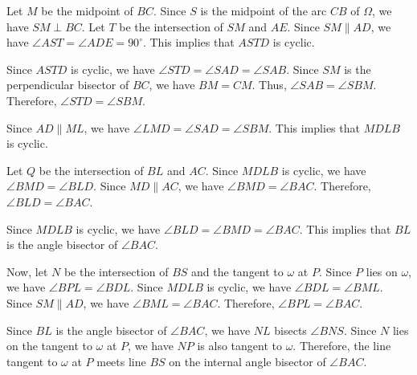 Let $M$ be the midpoint of $BC$. Since $S$ is the midpoint of the arc $CB$ of $\Omega$, we have $SM \perp BC$. Let $T$ be the intersection of $SM$ and $AE$. Since $SM \parallel AD$, we have $\angle AST = \angle ADE = 90^\circ$. This implies that $ASTD$ is cyclic.

Since $ASTD$ is cyclic, we have $\angle STD = \angle SAD = \angle SAB$. Since $SM$ is the perpendicular bisector of $BC$, we have $BM = CM$. Thus, $\angle SAB = \angle SBM$. Therefore, $\angle STD = \angle SBM$.

Since $AD \parallel ML$, we have $\angle LMD = \angle SAD = \angle SBM$. This implies that $MDLB$ is cyclic.

Let $Q$ be the intersection of $BL$ and $AC$. Since $MDLB$ is cyclic, we have $\angle BMD = \angle BLD$. Since $MD \parallel AC$, we have $\angle BMD = \angle BAC$. Therefore, $\angle BLD = \angle BAC$.

Since $MDLB$ is cyclic, we have $\angle BLD = \angle BMD = \angle BAC$. This implies that $BL$ is the angle bisector of $\angle BAC$.

Now, let $N$ be the intersection of $BS$ and the tangent to $\omega$ at $P$. Since $P$ lies on $\omega$, we have $\angle BPL = \angle BDL$. Since $MDLB$ is cyclic, we have $\angle BDL = \angle BML$. Since $SM \parallel AD$, we have $\angle BML = \angle BAC$. Therefore, $\angle BPL = \angle BAC$.

Since $BL$ is the angle bisector of $\angle BAC$, we have $NL$ bisects $\angle BNS$. Since $N$ lies on the tangent to $\omega$ at $P$, we have $NP$ is also tangent to $\omega$. Therefore, the line tangent to $\omega$ at $P$ meets line $BS$ on the internal angle bisector of $\angle BAC$.
